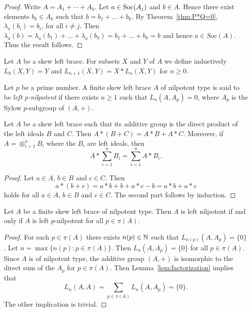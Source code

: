 \begin{proof}
Write $A=A_1+\cdots+A_k$. Let $a\in \operatorname{Soc}(A_j)$ and $b\in A$. Hence
there exist elements $b_k\in A_k$ such that $b=b_1+\dots +b_k$. By
Theorem~\ref{thm:P*Q=0}, $\lambda_a(b_i)=b_i$, for all $i\neq j$.
Then $\lambda_a(b)=\lambda_a(b_1)+\dots +\lambda_a(b_k)=b_1+\dots
+b_k=b$ and hence $a\in Soc(A)$. Thus the result follows.
\end{proof}




Let $A$ be a skew left brace. For subsets $X$ and $Y$ of $A$ 
we define inductively $L_0(X,Y)=Y$ and $L_{n+1}(X,Y)=X*L_n(X,Y)$ for $n\geq0$.

\begin{definition}
    Let $p$ be a prime number. A finite skew left brace $A$ of nilpotent type is said to be \emph{left $p$-nilpotent} if there exists $n\geq1$ such that $L_n(A,A_p)=0$, where $A_p$ is the Sylow $p$-subgroup of $(A,+)$.
\end{definition}

\begin{lemma}
\label{lem:factorization}
    Let $A$ be a skew left brace such that its additive group is the direct product of the left 
    ideals $B$ and $C$. Then $A*(B+C)=A*B+A*C$. Moreover, if $A=\oplus_{i=1}^{n} B_i$ where the $B_i$ are left ideals, then 
    \[
    A*\sum_{i=1}^{n} B_i=\sum_{i=1}^{n} A*B_i.
    \]
\end{lemma}

\begin{proof}
    Let $a\in A$, $b\in B$ and $c\in C$. 
    Then 
    \[
    a*(b+c)=a*b+b+a*c-b=a*b+a*c
    \]
    holds for all $a\in A$, $b\in B$ and $c\in C$.
    The second part follows by induction.
\end{proof}

\begin{proposition}
    \label{pro:left_p}
    Let $A$ be a finite skew left brace of nilpotent type. Then $A$ 
    is left nilpotent if and only if $A$ is left $p$-nilpotent for all $p\in\pi(A)$.
\end{proposition}

\begin{proof}
    For each $p\in\pi(A)$ 
    there exists $n(p)\in\mathbb{N}$ such that $L_{n(p)}(A,A_p)=\{0\}$. Let
    $n=\max\{n(p):p\in\pi(A)\}$. Then $L_n(A,A_p)=\{0\}$ for all $p\in\pi(A)$. Since
    $A$ is of nilpotent type, the additive group $(A,+)$ is isomorphic to the direct sum 
    of the $A_p$ for $p\in\pi(A)$. 
    Then Lemma~\ref{lem:factorization} implies that 
    \[
    L_n(A,A)=\sum_{p\in\pi(A)}L_n(A,A_p)=\{0\}.
    \]
    The other implication is trivial. 
\end{proof}

